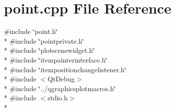 \section{point.\+cpp File Reference}
\label{bk3_2curve_2point_8cpp}
{\ttfamily \#include \char`\"{}point.\+h\char`\"{}}\\*
{\ttfamily \#include \char`\"{}pointprivate.\+h\char`\"{}}\\*
{\ttfamily \#include \char`\"{}plotscenewidget.\+h\char`\"{}}\\*
{\ttfamily \#include \char`\"{}itempainterinterface.\+h\char`\"{}}\\*
{\ttfamily \#include \char`\"{}itempositionchangelistener.\+h\char`\"{}}\\*
{\ttfamily \#include $<$Qt\+Debug$>$}\\*
{\ttfamily \#include \char`\"{}../qgraphicsplotmacros.\+h\char`\"{}}\\*
{\ttfamily \#include $<$stdio.\+h$>$}\\*
